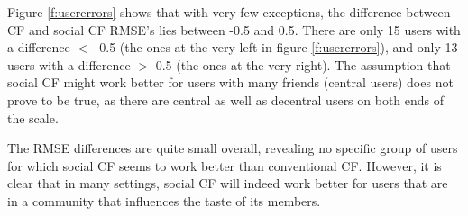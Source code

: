 Figure \ref{f:usererrors} shows that with very few exceptions, the difference between CF and social CF RMSE's lies between -0.5 and 0.5. There are only 15 users with a difference $<$ -0.5 (the ones at the very left in figure \ref{f:usererrors}), and only 13 users with a difference $>$ 0.5 (the ones at the very right). The assumption that social CF might work better for users with many friends (central users) does not prove to be true, as there are central as well as decentral users on both ends of the scale.

The RMSE differences are quite small overall, revealing no specific group of users for which social CF seems to work better than conventional CF. However, it is clear that in many settings, social CF will indeed work better for users that are in a community that influences the taste of its members.
